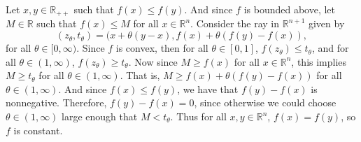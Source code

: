 \documentclass[12pt]{article}
\newcommand{\R}{\mathbb{R}}
\begin{document}
Let $x,y\in\R_{++}$ such that $f(x)\leq f(y)$. And since $f$ is bounded above, let $M\in\R$ such that $f(x)\leq M$ for all $x\in\R^n$. Consider the ray in $\R^{n+1}$ given by
\[(z_\theta,t_\theta) = (x + \theta(y-x), f(x) + \theta (f(y)-f(x)),\]
for all $\theta\in[0,\infty)$. Since $f$ is convex, then for all $\theta\in[0,1]$, $f(z_\theta)\leq t_\theta$, and for all $\theta\in(1,\infty)$, $f(z_\theta)\geq t_\theta$. Now since $M\geq f(x)$ for all $x\in\R^n$, this implies $M\geq t_\theta$ for all $\theta\in(1,\infty)$. That is, $M\geq f(x)+\theta(f(y)-f(x))$ for all $\theta\in(1,\infty)$. And since $f(x)\leq f(y)$, we have that $f(y)-f(x)$ is nonnegative. Therefore, $f(y)-f(x)=0$, since otherwise we could choose $\theta\in(1,\infty)$ large enough that $M<t_\theta$. Thus for all $x,y\in\R^n$, $f(x)=f(y)$, so $f$ is constant.
\end{document}
